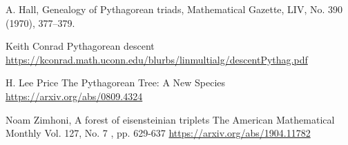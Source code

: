 \documentclass[12pt,a4paper]{amsart}
\begin{document}
 A. Hall, 
 Genealogy of Pythagorean triads, 
 Mathematical Gazette, LIV, No. 390
(1970), 377–379.

Keith Conrad
Pythagorean descent
\url{https://kconrad.math.uconn.edu/blurbs/linmultialg/descentPythag.pdf}


H. Lee Price
 The Pythagorean Tree: A New Species
 \url{https://arxiv.org/abs/0809.4324}

Noam Zimhoni,
 A forest of eisensteinian triplets
The American Mathematical Monthly
Vol. 127, No. 7 , pp. 629-637 \url{https://arxiv.org/abs/1904.11782}
\end{document}
